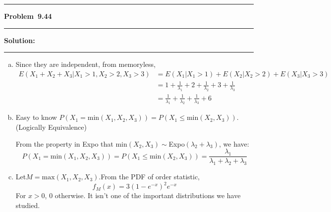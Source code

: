 \documentclass[10.5pt]{article}
\newcommand\question[1]{\vspace{.2in}\hrule\vspace{0.04in}\textbf{Problem\ #1}\vspace{.4em}\hrule\vspace{.10in}}
\newcommand\Solution{\vspace{.3in}\textbf{Solution:}\vspace{.5em}\hrule\vspace{.08in}\par}
\begin{document}
\pagebreak
\question{9.44}
\Solution{}
\begin{enumerate}[(a)]
	\item Since they are independent, from memoryless, \begin{align*}
		E(X_1+X_2+X_3|X_1>1, X_2>2, X_3>3) &= E(X_1|X_1>1)+E(X_2|X_2>2)+E(X_3|X_3>3)\\[6pt]
		&= 1+\frac{1}{\lambda_1}+2+\frac{1}{\lambda_2}+3+\frac{1}{\lambda_3}\\[6pt]
		&= \frac{1}{\lambda_1}+\frac{1}{\lambda_2}+\frac{1}{\lambda_3}+6
	\end{align*}\vspace{1cm}

	
	\item Easy to know $P(X_1 = \text{min}(X_1, X_2, X_3)) = P(X_1\leqslant\text{min}(X_2, X_3))$. (Logically Equivalence)
	
	From the property in Expo that min$(X_2, X_3)\sim$Expo$(\lambda_2+\lambda_3)$, we have:
	$$P(X_1 = \text{min}(X_1, X_2, X_3)) = P(X_1\leqslant\text{min}(X_2, X_3)) = \frac{\lambda_1}{\lambda_1+\lambda_2+\lambda_3}$$


	\vspace{1cm}
	\item Let$M = \text{max}(X_1, X_2, X_3)$.From the PDF of order statistic,
	$$f_M(x) = 3(1-e^{-x})^2e^{-x}$$
	For $x>0$, $0$ otherwise.
	It isn't one of the important distributions we have studied.
\end{enumerate}
\end{document}
